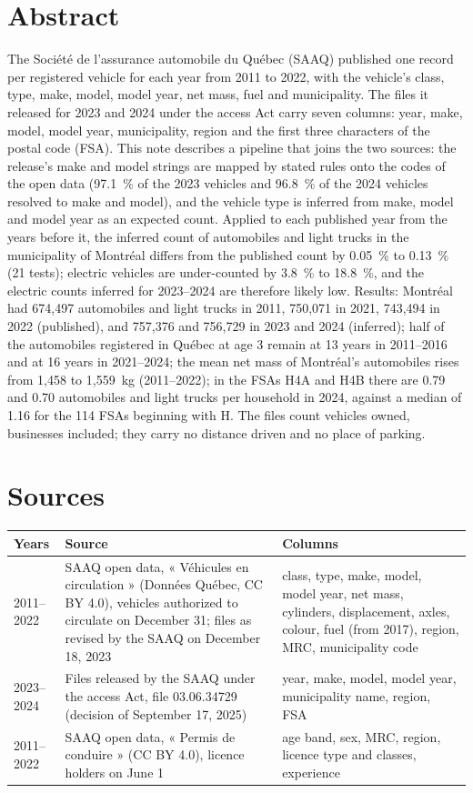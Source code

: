 \documentclass[10.5pt,a4paper]{article}
\begin{document}
\section*{Abstract}
The Société de l'assurance automobile du Québec (SAAQ) published one record per registered vehicle for each year from 2011 to 2022, with the vehicle's class, type, make, model, model year, net mass, fuel and municipality. The files it released for 2023 and 2024 under the access Act carry seven columns: year, make, model, model year, municipality, region and the first three characters of the postal code (FSA). This note describes a pipeline that joins the two sources: the release's make and model strings are mapped by stated rules onto the codes of the open data (97.1~\% of the 2023 vehicles and 96.8~\% of the 2024 vehicles resolved to make and model), and the vehicle type is inferred from make, model and model year as an expected count. Applied to each published year from the years before it, the inferred count of automobiles and light trucks in the municipality of Montréal differs from the published count by 0.05~\% to 0.13~\% (21 tests); electric vehicles are under-counted by 3.8~\% to 18.8~\%, and the electric counts inferred for 2023--2024 are therefore likely low. Results: Montréal had 674{,}497 automobiles and light trucks in 2011, 750{,}071 in 2021, 743{,}494 in 2022 (published), and 757{,}376 and 756{,}729 in 2023 and 2024 (inferred); half of the automobiles registered in Québec at age 3 remain at 13 years in 2011--2016 and at 16 years in 2021--2024; the mean net mass of Montréal's automobiles rises from 1{,}458 to 1{,}559~kg (2011--2022); in the FSAs H4A and H4B there are 0.79 and 0.70 automobiles and light trucks per household in 2024, against a median of 1.16 for the 114 FSAs beginning with H. The files count vehicles owned, businesses included; they carry no distance driven and no place of parking.

\tableofcontents

\section{Sources}
\begin{tabular}{@{}p{1.9cm}p{6.2cm}p{7.2cm}@{}}\toprule
Years & Source & Columns \\\midrule
2011--2022 & SAAQ open data, « Véhicules en circulation » (Données Québec, CC BY 4.0), vehicles authorized to circulate on December 31; files as revised by the SAAQ on December 18, 2023 & class, type, make, model, model year, net mass, cylinders, displacement, axles, colour, fuel (from 2017), region, MRC, municipality code \\[4pt]
2023--2024 & Files released by the SAAQ under the access Act, file 03.06.34729 (decision of September 17, 2025) & year, make, model, model year, municipality name, region, FSA \\[4pt]
2011--2022 & SAAQ open data, « Permis de conduire » (CC BY 4.0), licence holders on June 1 & age band, sex, MRC, region, licence type and classes, experience \\\bottomrule
\end{tabular}
\end{document}
